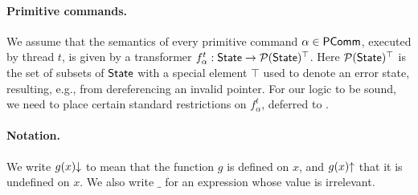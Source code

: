 





 
\paragraph{Primitive commands.}
We assume that the semantics of every primitive command $\alpha\in{\sf PComm}$,
executed by thread $t$, is given by a transformer $f_\alpha^t:{\sf State} \to
\mathcal{P}({\sf State})^\top$. Here $\mathcal{P}({\sf State})^\top$ is the set of subsets of
${\sf State}$ with a special element $\top$ used to denote an error state, resulting,
e.g., from dereferencing an invalid pointer.  
For our logic to be sound, we need to place certain standard restrictions on 
$f_\alpha^t$, deferred to \tr{\ref{app:formal}}{\nformal}.  


\paragraph{Notation.}
We write $g(x)\mathpunct{\downarrow}$ to mean that the function $g$ is defined
on $x$, and $g(x)\mathpunct{\uparrow}$ that it is undefined on $x$.
We also write $\_$ for an expression whose value is irrelevant.

